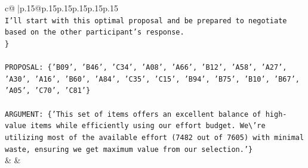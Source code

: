 \documentclass{article}
\begin{document}
{\begin{supertabular}{c@{$\;$}|p{.15\linewidth}@{}p{.15\linewidth}p{.15\linewidth}p{.15\linewidth}p{.15\linewidth}p{.15\linewidth}}
{{{\\ 
\texttt{I'll start with this optimal proposal and be prepared to negotiate based on the other participant's response.} \\
\texttt{\}} \\
\\ 
\texttt{PROPOSAL: \{'B09', 'B46', 'C34', 'A08', 'A66', 'B12', 'A58', 'A27', 'A30', 'A16', 'B60', 'A84', 'C35', 'C15', 'B94', 'B75', 'B10', 'B67', 'A05', 'C70', 'C81'\}} \\
\\ 
\texttt{ARGUMENT: \{'This set of items offers an excellent balance of high{-}value items while efficiently using our effort budget. We\textbackslash{}'re utilizing most of the available effort (7482 out of 7605) with minimal waste, ensuring we get maximum value from our selection.'\}} \\
            }
        }
    }
    & & \\ \\


\end{supertabular}}
\end{document}
